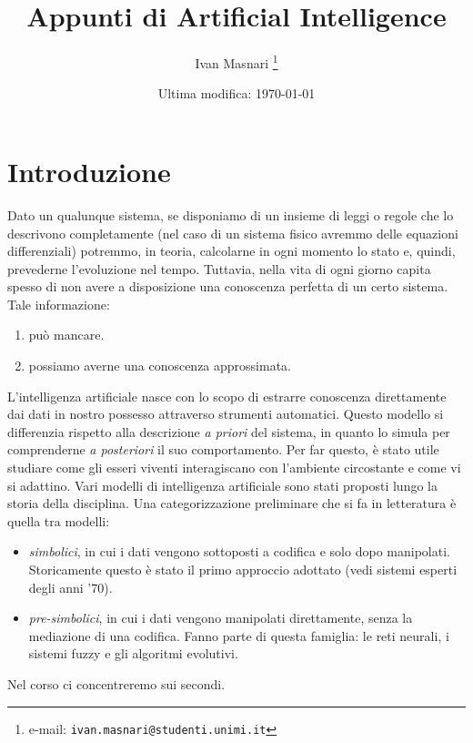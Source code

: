 \documentclass[10pt,a4paper]{article}
\begin{document}
\title{Appunti di Artificial Intelligence}

\author{Ivan Masnari%
  \thanks{e-mail: \texttt{ivan.masnari@studenti.unimi.it}}}

\date{Ultima modifica: \today}
\maketitle

\tableofcontents
\pagebreak
\section{Introduzione}

Dato un qualunque sistema, se disponiamo di un insieme di leggi o regole che lo descrivono completamente (nel caso di un sistema fisico avremmo delle equazioni differenziali) potremmo, in teoria, calcolarne in ogni momento lo stato e, quindi, prevederne l'evoluzione nel tempo. 
Tuttavia, nella vita di ogni giorno capita spesso di non avere a disposizione una conoscenza perfetta di un certo sistema. Tale informazione:
\begin{enumerate}
\item{può mancare.}
\item{possiamo averne una conoscenza approssimata.}
\end{enumerate}
L'intelligenza artificiale nasce con lo scopo di estrarre conoscenza direttamente dai dati in nostro possesso attraverso strumenti automatici. Questo modello si differenzia rispetto alla descrizione \emph{a priori} del sistema, in quanto lo simula per comprenderne \emph{a posteriori} il suo comportamento. Per far questo, è stato utile studiare come gli esseri viventi interagiscano con l'ambiente circostante e come vi si adattino.
Vari modelli di intelligenza artificiale sono stati proposti lungo la storia della disciplina. Una categorizzazione preliminare che si fa in letteratura è quella tra modelli:
\begin{itemize}
\item{\emph{simbolici}, in cui i dati vengono sottoposti a codifica e solo dopo manipolati. Storicamente questo è stato il primo approccio adottato (vedi sistemi esperti degli anni '70).}
\item{\emph{pre-simbolici}, in cui i dati vengono manipolati direttamente, senza la mediazione di una codifica. Fanno parte di questa famiglia: le reti neurali, i sistemi fuzzy e gli algoritmi evolutivi.}
\end{itemize}
Nel corso ci concentreremo sui secondi.
\end{document}
